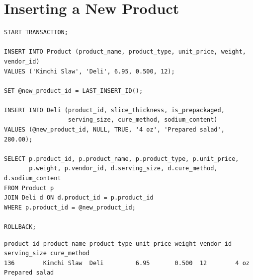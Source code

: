 \section{Inserting a New Product}

{\scriptsize
\begin{verbatim}
START TRANSACTION;

INSERT INTO Product (product_name, product_type, unit_price, weight, vendor_id)
VALUES ('Kimchi Slaw', 'Deli', 6.95, 0.500, 12);

SET @new_product_id = LAST_INSERT_ID();

INSERT INTO Deli (product_id, slice_thickness, is_prepackaged,
                  serving_size, cure_method, sodium_content)
VALUES (@new_product_id, NULL, TRUE, '4 oz', 'Prepared salad', 280.00);

SELECT p.product_id, p.product_name, p.product_type, p.unit_price,
       p.weight, p.vendor_id, d.serving_size, d.cure_method, d.sodium_content
FROM Product p
JOIN Deli d ON d.product_id = p.product_id
WHERE p.product_id = @new_product_id;

ROLLBACK;
\end{verbatim}
}

{\scriptsize
\begin{verbatim}
product_id product_name product_type unit_price weight vendor_id serving_size cure_method
136        Kimchi Slaw  Deli         6.95       0.500  12        4 oz         Prepared salad
\end{verbatim}
}
